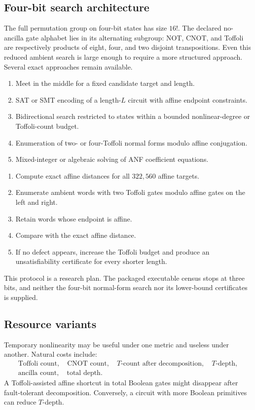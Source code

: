 \subsection{Four-bit search architecture}
The full permutation group on four-bit states has size $16!$.  The declared no-ancilla gate alphabet lies in its alternating subgroup: NOT, CNOT, and Toffoli are respectively products of eight, four, and two disjoint transpositions.  Even this reduced ambient search is large enough to require a more structured approach.  Several exact approaches remain available.
\begin{enumerate}
\item Meet in the middle for a fixed candidate target and length.
\item SAT or SMT encoding of a length-$L$ circuit with affine endpoint constraints.
\item Bidirectional search restricted to states within a bounded nonlinear-degree or Toffoli-count budget.
\item Enumeration of two- or four-Toffoli normal forms modulo affine conjugation.
\item Mixed-integer or algebraic solving of ANF coefficient equations.
\end{enumerate}

\begin{protocol}
\begin{enumerate}
\item Compute exact affine distances for all $322{,}560$ affine targets.
\item Enumerate ambient words with two Toffoli gates modulo affine gates on the left and right.
\item Retain words whose endpoint is affine.
\item Compare with the exact affine distance.
\item If no defect appears, increase the Toffoli budget and produce an unsatisfiability certificate for every shorter length.
\end{enumerate}
\end{protocol}
This protocol is a research plan.  The packaged executable census stops at three bits, and neither the four-bit normal-form search nor its lower-bound certificates is supplied.

\subsection{Resource variants}
Temporary nonlinearity may be useful under one metric and useless under another.  Natural costs include:
\[
\begin{gathered}
\text{Toffoli count},\quad \text{CNOT count},\quad
T\text{-count after decomposition},\quad T\text{-depth},\\
\text{ancilla count},\quad \text{total depth}.
\end{gathered}
\]
A Toffoli-assisted affine shortcut in total Boolean gates might disappear after fault-tolerant decomposition.  Conversely, a circuit with more Boolean primitives can reduce $T$-depth.

